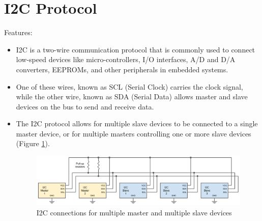 \section{I2C Protocol}
Features:
\begin{itemize}
    \item I2C is a two-wire communication protocol that is commonly used to connect low-speed devices like micro-controllers, I/O interfaces, A/D and D/A converters, EEPROMs, and other peripherals in embedded systems.
    \item One of these wires, known as SCL (Serial Clock) carries the clock signal, while the other wire, known as SDA (Serial Data) allows master and slave devices on the bus to send and receive data. 
    \item The I2C protocol allows for multiple slave devices to be connected to a single master device, or for multiple masters controlling one or more slave devices (Figure \ref{I2C_multi_master}).
    
    \begin{figure}[h!]
    \centering
    \includegraphics[width=\columnwidth]{./Figures/I2C_multi_master.png}
    \caption{I2C connections for multiple master and multiple slave devices}
    \label{I2C_multi_master}
    \end{figure}
    
\end{itemize}